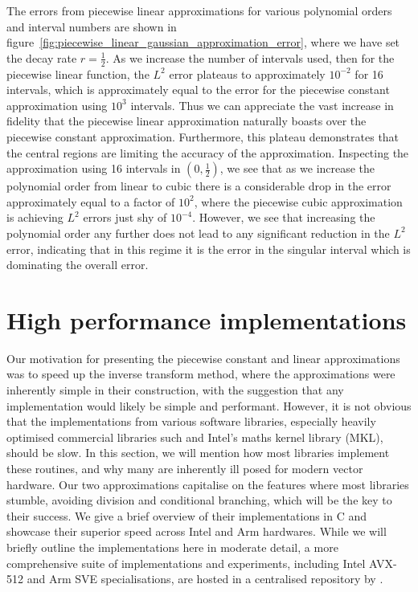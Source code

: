 \documentclass[manuscript,review]{acmart}
\begin{document}
The errors from piecewise linear approximations for various polynomial orders and interval numbers are shown in figure~\ref{fig:piecewise_linear_gaussian_approximation_error}, where we have set the decay rate $ r = \tfrac{1}{2} $. As we increase the number of intervals used, then for the piecewise linear function, the $ L^2 $ error plateaus to approximately $ 10^{-2} $ for 16 intervals, which is approximately equal to the error for the piecewise constant approximation using $ 10^3 $ intervals. Thus we can appreciate the vast increase in fidelity that the piecewise linear approximation naturally boasts over the piecewise constant approximation. Furthermore, this plateau demonstrates that the central regions are limiting the accuracy of the approximation. Inspecting the approximation using 16 intervals in $ (0, \tfrac{1}{2}) $, we see that as we increase the polynomial order from linear to cubic there is a considerable drop in the error approximately equal to a factor of $ 10^2 $, where the piecewise cubic approximation is achieving $ L^2 $ errors just shy of $ 10^{-4} $. However, we see that increasing the polynomial order any further does not lead to any significant reduction in the $ L^2 $ error, indicating that in this regime it is the error in the singular interval which is dominating the overall error. 

\section{High performance implementations}
\label{sec:high_performance_impementations}

Our motivation for presenting the piecewise constant and linear approximations was to speed up the inverse transform method, where the approximations were inherently simple in their construction, with the suggestion that any implementation would likely be simple and performant. However, it is not obvious that the implementations from various software libraries, especially heavily optimised commercial libraries such and Intel's maths kernel library (MKL), should be slow. In this section, we will mention how most libraries implement these routines, and why many are inherently ill posed for modern vector hardware. Our two approximations capitalise on the features where most libraries stumble, avoiding division and conditional branching, which will be the key to their success. We give a brief overview of their implementations in C and showcase their superior speed across Intel and Arm hardwares. While we will briefly outline the implementations here in moderate detail, a more comprehensive suite of implementations and experiments, including Intel AVX-512 and Arm SVE specialisations, are hosted in a centralised repository by \citet{sheridan2020approximate_random}.
\end{document}

